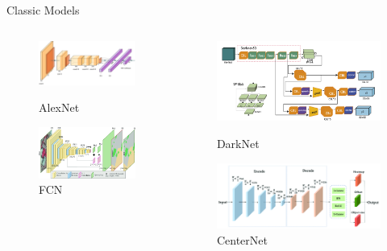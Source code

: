 \begin{frame}{Classic Models}
	\begin{columns}
		\begin{column}{0.5\textwidth}
			\begin{figure}[h]
				\centering
				\includegraphics[width=0.75\columnwidth]{images/alexnet.png}
				\caption{AlexNet}
				\includegraphics[width=0.7\columnwidth]{images/fcn.png}
				\caption{FCN}
			\end{figure}
		\end{column}
		\begin{column}{0.5\textwidth}
			\begin{figure}[h]
				\includegraphics[width=0.7\columnwidth]{images/darknet.png}
				\caption{DarkNet}
				\includegraphics[width=0.75\columnwidth]{images/centernet.png}
				\caption{CenterNet}
			\end{figure}
		\end{column}
	\end{columns}
\end{frame}





